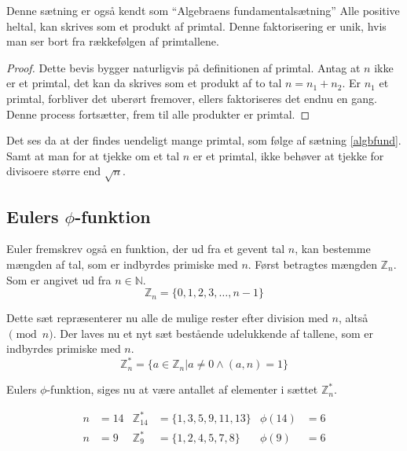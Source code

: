 


    \begin{sent}%
        Denne sætning er også kendt som ``Algebraens fundamentalsætning''
        Alle positive heltal, kan skrives som et produkt af primtal.
        Denne faktorisering er unik, hvis man ser bort fra rækkefølgen af primtallene.
        \label{algbfund}
    \end{sent}

    \begin{proof}
        Dette bevis bygger naturligvis på definitionen af primtal.
        Antag at \(n\) ikke er et primtal, det kan da skrives som et produkt af to tal \(n = n_1 + n_2\).
        Er \(n_1\) et primtal, forbliver det uberørt fremover, ellers faktoriseres det endnu en gang.
        Denne process fortsætter, frem til alle produkter er primtal.
    \end{proof}

    Det ses da at der findes uendeligt mange primtal, som følge af sætning \ref{algbfund}.
    Samt at man for at tjekke om et tal \(n\) er et primtal, ikke behøver at tjekke for divisoere større end \(\sqrt{n}\).



    \subsection{Eulers \texorpdfstring{\(\phi\)}{Lg}-funktion}
    Euler fremskrev også en funktion, der ud fra et gevent tal \(n\), kan bestemme mængden af tal, som er indbyrdes primiske med \(n\).
    Først betragtes mængden \(\mathbb{Z}_n\). Som er angivet ud fra \(n \in \mathbb{N}\).
    \[\mathbb{Z}_n = \{0, 1, 2, 3, \hdots, n-1 \}\]

    Dette sæt repræsenterer nu alle de mulige rester efter division med \(n\), altså \(\pmod{n}\).
    Der laves nu et nyt sæt bestående udelukkende af tallene, som er indbyrdes primiske med \(n\).
    \[\mathbb{Z}_n^* = \{a \in \mathbb{Z}_n | a \neq 0 \land (a, n) = 1\}\]

    Eulers \(\phi\)-funktion, siges nu at være antallet af elementer i sættet \(\mathbb{Z}_n^*\).

    \begin{eks}
        \mbox{}\vspace*{-1.5em}
        \begin{align*}
            n &= 14 & \mathbb{Z}_{14}^*  &= \{1, 3, 5, 9, 11, 13 \} & \phi(14) &= 6\\
            n &= 9  & \mathbb{Z}_9^*     &= \{1, 2, 4, 5, 7, 8\}    & \phi(9)  &= 6
        \end{align*}
    \end{eks}

